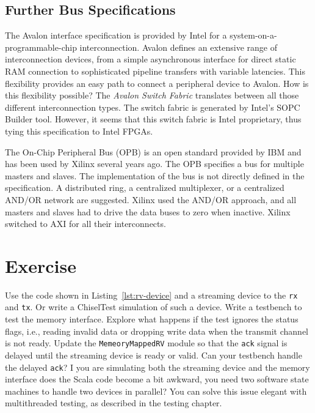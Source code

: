 \documentclass[%
    10pt,
    headinclude, footexclude,
    openright, %
    notitlepage,
    cleardoubleempty,
    headsepline,
    pointlessnumbers,
    bibtotoc, idxtotoc,
    ]{scrbook}
\newcommand{\code}[1]{{\lstinline[basicstyle=\small\ttfamily]{#1}}}
\newcommand{\todo}[1]{{\emph{TODO: #1}}}
\renewcommand{\todo}[1]{}
\begin{document}
\todo{Copy some code from Patmos for an example.}

\subsection{Further Bus Specifications}

The Avalon \cite{soc:avalon} interface specification is provided by
Intel for a system-on-a-programmable-chip interconnection.
Avalon defines an extensive range of interconnection devices, from
a simple asynchronous interface for direct static RAM
connection to sophisticated pipeline transfers with variable
latencies. This flexibility provides an easy path to connect a
peripheral device to Avalon. How is this flexibility possible? The
\emph{Avalon Switch Fabric} translates between all those different
interconnection types. The switch fabric is generated by Intel's
SOPC Builder tool. However, it seems that this switch fabric is
Intel proprietary, thus tying this specification to Intel FPGAs.

The On-Chip Peripheral Bus (OPB) \cite{soc:opb} is an open standard
provided by IBM and has been used by Xilinx several years ago.
The OPB specifies a bus for
multiple masters and slaves. The implementation of the bus is not
directly defined in the specification. A distributed ring, a
centralized multiplexer, or a centralized AND/OR network are
suggested. Xilinx used the AND/OR approach, and all masters and
slaves had to drive the data buses to zero when inactive.
Xilinx switched to AXI for all their interconnects.

\section{Exercise}

Use the code shown in Listing~\ref{lst:rv-device} and a streaming device to the \code{rx}
and \code{tx}. Or write a ChiselTest simulation of such a device. Write a testbench
to test the memory interface. Explore what happens if the test ignores the status flags,
i.e., reading invalid data or dropping write data when the transmit channel is not ready.
Update the \code{MemeoryMappedRV} module so that the \code{ack} signal is delayed until
the streaming device is ready or valid. Can your testbench handle the delayed \code{ack}?
I you are simulating both the streaming device and the memory interface does the Scala
code become a bit awkward, you need two software state machines to handle
two devices in parallel? You can solve this issue elegant with multithreaded testing,
as described in the testing chapter.
\end{document}
